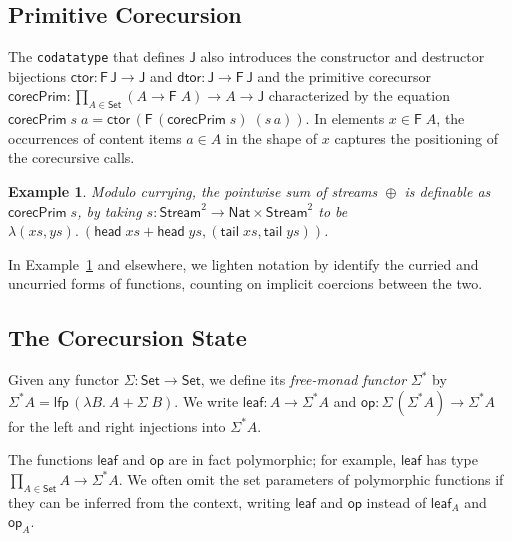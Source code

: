 \documentclass[preprint,draft]
{sigplanconf}
\newcommand\TC{\mathsf}
\newcommand\keyw[1]{\texttt{#1}}
\newtheorem{eexample}[theorem]{Example}
\newcommand{\ra}{\rightarrow}
\newcommand{\<}{\langle}
\renewcommand{\>}{\rangle}
\newcommand{\talg}{{{\mathsf{op}}}}
\renewcommand{\eta}{{{\mathsf{leaf}}}}
\newcommand{\ctor}{{{\mathsf{ctor}}}}
\newcommand{\dtor}{{{\mathsf{dtor}}}}
\newcommand{\lfp}{{{\mathsf{lfp}}}}
\newcommand{\corec}{{{\mathsf{corecPrim}}}}
\newcommand{\hd}{{{\mathsf{head}}}}
\newcommand{\tl}{{{\mathsf{tail}}}}
\newcommand{\opls}{\mathrel\oplus}
\newcommand{\F}{{\TC{F}}}
\newcommand{\J}{{\TC{J}}}
\renewcommand{\SS}{{\TC{\Sigma}}}
\newcommand{\xs}{{\mathit{xs}}}
\newcommand{\ys}{{\mathit{ys}}}
\newcommand\Set{\TC{Set}}
\newcommand\Stream{\TC{Stream}}
\newcommand\Nat{{\TC{Nat}}}
\begin{document}
\subsection{Primitive Corecursion}
\label{sec-prim}

The \keyw{codatatype} that defines $\J$
also introduces the constructor and destructor bijections
$\ctor : \F\,\J \ra \J$ and $\dtor : \J \ra \F\,\J$ and the primitive corecursor
$\corec : \prod_{A \in \Set} (A \ra \F\;A) \ra A \ra \J$ characterized
by the equation $\corec\;s\;a = \ctor\,(\F\,(\corec\;s)\;(s\,a))$.
In elements $x \in \F\;A$,
the occurrences of content items $a \in A$ in the shape of $x$
captures the positioning of the corecursive calls.

\begin{eexample}\label{exa-prim} \rm
Modulo currying, the pointwise sum of streams $\opls$ is definable as $\corec\;s$,
by taking $s : \Stream^2 \ra \Nat \times \Stream^2$ to be $\lambda (\xs,\ys).~(\hd\;\xs + \hd\;\ys, (\tl\;\xs,\tl\;\ys))$.
\end{eexample}

In Example~\ref{exa-prim} and elsewhere, we lighten notation by identify
the curried and uncurried forms of functions, counting on implicit coercions
between the two.

\subsection{The Corecursion State}
\label{sec-state}

Given any functor $\SS : \Set \ra \Set$, we define its {\em free-monad functor} $\SS^*$ by $\SS^*A = \lfp\,(\lambda B.~A + \SS\;B)$.
We write $\eta : A \ra \SS^*A$ and $\talg : \SS\,(\SS^*A) \ra \SS^*A$ for the left and right injections
into $\SS^*A$.

The functions $\eta$ and $\talg$ are in fact polymorphic; for example,
$\eta$ has type $\prod_{A \in \Set} A \ra \SS^*A$.
We often omit the set parameters of polymorphic functions if they can be inferred from the context, writing $\eta$ and $\talg$ instead of
$\eta_A$ and $\talg_A$.
\end{document}
